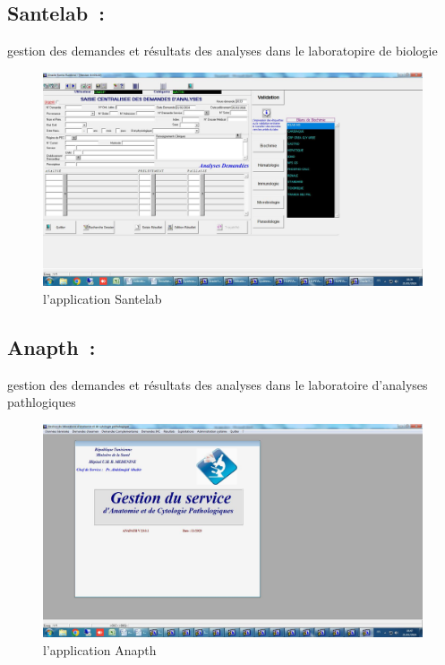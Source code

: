 \documentclass[12pt]{rapportINPTCLOUD}
\begin{document}
\subsection{Santelab :}   gestion des demandes et résultats des analyses dans le laboratopire de biologie 
\begin{figure}[H]
	\centering
	\includegraphics[width=1\linewidth]{img/h.jpg}
	\caption{l'application Santelab}
	\label{fig:Santelab}
\end{figure}
\newpage
\subsection{Anapth :} gestion des demandes et résultats des analyses dans le laboratoire d’analyses pathlogiques 
\begin{figure}[H]
	\centering
	\includegraphics[width=1\linewidth]{img/i.jpg}
	\caption{l'application Anapth}
	\label{fig:Anapth}
\end{figure}
\end{document}

